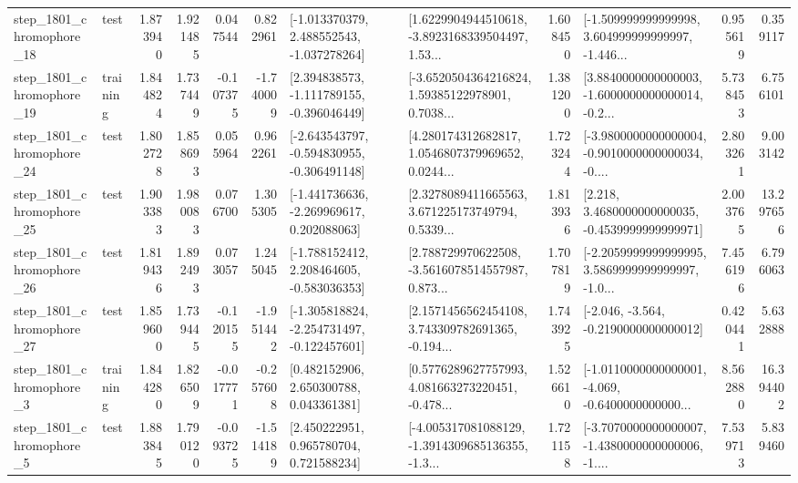 \begin{tabular}{llrrrrllrlrr}
 step\_1801\_chromophore\_18 &      test &      1.873940 &    1.921485 &      0.047544 &  0.822961 &   [-1.013370379, 2.488552543, -1.037278264] &  [1.6229904944510618, -3.8923168339504497, 1.53... &       1.608450 &  [-1.509999999999998, 3.604999999999997, -1.446... &            0.955619 &          0.359117 \\
 step\_1801\_chromophore\_19 &  training &      1.844824 &    1.737449 &     -0.107375 & -1.740009 &   [2.394838573, -1.111789155, -0.396046449] &  [-3.6520504364216824, 1.59385122978901, 0.7038... &       1.381200 &  [3.8840000000000003, -1.6000000000000014, -0.2... &            5.738453 &          6.756101 \\
 step\_1801\_chromophore\_24 &      test &      1.802728 &    1.858693 &      0.055964 &  0.962261 &  [-2.643543797, -0.594830955, -0.306491148] &  [4.280174312682817, 1.0546807379969652, 0.0244... &       1.723244 &  [-3.9800000000000004, -0.9010000000000034, -0.... &            2.803261 &          9.003142 \\
 step\_1801\_chromophore\_25 &      test &      1.903383 &    1.980083 &      0.076700 &  1.305305 &   [-1.441736636, -2.269969617, 0.202088063] &  [2.3278089411665563, 3.671225173749794, 0.5339... &       1.813936 &   [2.218, 3.4680000000000035, -0.4539999999999971] &            2.003765 &         13.297656 \\
 step\_1801\_chromophore\_26 &      test &      1.819436 &    1.892493 &      0.073057 &  1.245045 &   [-1.788152412, 2.208464605, -0.583036353] &  [2.788729970622508, -3.5616078514557987, 0.873... &       1.707819 &  [-2.2059999999999995, 3.5869999999999997, -1.0... &            7.456196 &          6.796063 \\
 step\_1801\_chromophore\_27 &      test &      1.859600 &    1.739445 &     -0.120155 & -1.951442 &  [-1.305818824, -2.254731497, -0.122457601] &  [2.1571456562454108, 3.743309782691365, -0.194... &       1.743925 &              [-2.046, -3.564, -0.2190000000000012] &            0.420441 &          5.632888 \\
  step\_1801\_chromophore\_3 &  training &      1.844280 &    1.826509 &     -0.017771 & -0.257608 &     [0.482152906, 2.650300788, 0.043361381] &  [0.5776289627757993, 4.081663273220451, -0.478... &       1.526610 &  [-1.0110000000000001, -4.069, -0.6400000000000... &            8.562880 &         16.394402 \\
  step\_1801\_chromophore\_5 &      test &      1.883845 &    1.790120 &     -0.093725 & -1.514189 &     [2.450222951, 0.965780704, 0.721588234] &  [-4.005317081088129, -1.3914309685136355, -1.3... &       1.721158 &  [-3.7070000000000007, -1.4380000000000006, -1.... &            7.539713 &          5.839460 \\

\end{tabular}
